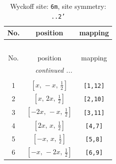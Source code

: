 \documentclass[fleqn,8pt]{jsarticle}
\begin{document}
\renewcommand{\arraystretch}{1.2}
\begin{longtable}{ccc}
\caption{Wyckoff site: {\tt 6m}, site symmetry: {\tt ..2'}}
 \\
 \hline \hline
No. & position & mapping \\ \hline \endfirsthead

\multicolumn{2}{l}{\tablename\ \thetable{}} \\
 \hline \hline
No. & position & mapping \\ \hline \endhead

 \hline \hline
\multicolumn{2}{r}{\footnotesize\it continued ...} \\ \endfoot

 \hline \hline
\multicolumn{2}{r}{} \\ \endlastfoot

1 & $\left[ x,\, - x,\, \frac{1}{2} \right]$ & {\tt [1,12]} \\ \hline
2 & $\left[ x,\, 2 x,\, \frac{1}{2} \right]$ & {\tt [2,10]} \\ \hline
3 & $\left[ - 2 x,\, - x,\, \frac{1}{2} \right]$ & {\tt [3,11]} \\ \hline
4 & $\left[ 2 x,\, x,\, \frac{1}{2} \right]$ & {\tt [4,7]} \\ \hline
5 & $\left[ - x,\, x,\, \frac{1}{2} \right]$ & {\tt [5,8]} \\ \hline
6 & $\left[ - x,\, - 2 x,\, \frac{1}{2} \right]$ & {\tt [6,9]} \\
\end{longtable}
\renewcommand{\arraystretch}{1.2}
\end{document}
